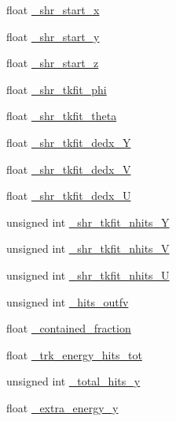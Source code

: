 \begin{DoxyCompactItemize}
\item 
float \hyperlink{classselection_1_1NuMuSelection_af38dabc2591bc0a81c564db0bb773d2c}{\+\_\+shr\+\_\+start\+\_\+x}
\item 
float \hyperlink{classselection_1_1NuMuSelection_af6c46477cac6efcb513d028e39f707d2}{\+\_\+shr\+\_\+start\+\_\+y}
\item 
float \hyperlink{classselection_1_1NuMuSelection_a9ecc838bf83d8279c7e975aff432f06e}{\+\_\+shr\+\_\+start\+\_\+z}
\item 
float \hyperlink{classselection_1_1NuMuSelection_a82badfd521973f96eb8e2b04d2d768f1}{\+\_\+shr\+\_\+tkfit\+\_\+phi}
\item 
float \hyperlink{classselection_1_1NuMuSelection_a8a3b5a7f7bc6fa4a59fbc36bfbf5a835}{\+\_\+shr\+\_\+tkfit\+\_\+theta}
\item 
float \hyperlink{classselection_1_1NuMuSelection_a1a04003daefae9bb8088709dae0705ca}{\+\_\+shr\+\_\+tkfit\+\_\+dedx\+\_\+Y}
\item 
float \hyperlink{classselection_1_1NuMuSelection_a9a054c559dfa6e536562f2e74d2954e0}{\+\_\+shr\+\_\+tkfit\+\_\+dedx\+\_\+V}
\item 
float \hyperlink{classselection_1_1NuMuSelection_ab7a3a2abb7bf04a5e3d6a190d1c8c415}{\+\_\+shr\+\_\+tkfit\+\_\+dedx\+\_\+U}
\item 
unsigned int \hyperlink{classselection_1_1NuMuSelection_a8104bfe11a01a3afc80e48eebf0b4f1f}{\+\_\+shr\+\_\+tkfit\+\_\+nhits\+\_\+Y}
\item 
unsigned int \hyperlink{classselection_1_1NuMuSelection_a089d245ba837cfc077d5f30dd1a309b5}{\+\_\+shr\+\_\+tkfit\+\_\+nhits\+\_\+V}
\item 
unsigned int \hyperlink{classselection_1_1NuMuSelection_a49ecf4415ef54632faa2317814210b36}{\+\_\+shr\+\_\+tkfit\+\_\+nhits\+\_\+U}
\item 
unsigned int \hyperlink{classselection_1_1NuMuSelection_ac2073c16d1ba83437d9fa66b0aa3ea38}{\+\_\+hits\+\_\+outfv}
\item 
float \hyperlink{classselection_1_1NuMuSelection_a5d7cbf03836116170b56615ab3b073c2}{\+\_\+contained\+\_\+fraction}
\item 
float \hyperlink{classselection_1_1NuMuSelection_a62b2fc85963f5b8c09b9a6306afbb84a}{\+\_\+trk\+\_\+energy\+\_\+hits\+\_\+tot}
\item 
unsigned int \hyperlink{classselection_1_1NuMuSelection_a6c1ae5a457aa2734684c6632abf34a8c}{\+\_\+total\+\_\+hits\+\_\+y}
\item 
float \hyperlink{classselection_1_1NuMuSelection_a9bbe9a46450cfb58e3559d943a5822c8}{\+\_\+extra\+\_\+energy\+\_\+y}
\end{DoxyCompactItemize}
